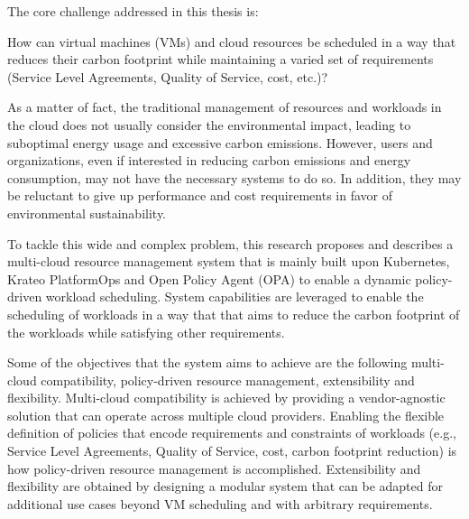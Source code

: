 
The core challenge addressed in this thesis is:
\begin{center}
    How can virtual machines (VMs) and cloud resources be scheduled in a way that reduces their carbon footprint while maintaining a varied set of requirements (Service Level Agreements, Quality of Service, cost, etc.)?
\end{center}

As a matter of fact, the traditional management of resources and workloads in the cloud does not usually consider the environmental impact, leading to suboptimal energy usage and excessive carbon emissions.
However, users and organizations, even if interested in reducing carbon emissions and energy consumption, may not have the necessary systems to do so.
In addition, they may be reluctant to give up performance and cost requirements in favor of environmental sustainability.

To tackle this wide and complex problem, this research proposes and describes a multi-cloud resource management system that is mainly built upon Kubernetes, Krateo PlatformOps and Open Policy Agent (OPA) to enable a dynamic policy-driven workload scheduling.
System capabilities are leveraged to enable the scheduling of workloads in a way that that aims to reduce the carbon footprint of the workloads while satisfying other requirements.

Some of the objectives that the system aims to achieve are the following multi-cloud compatibility, policy-driven resource management, extensibility and flexibility.
Multi-cloud compatibility is achieved by providing a vendor-agnostic solution that can operate across multiple cloud providers.
Enabling the flexible definition of policies that encode requirements and constraints of workloads (e.g., Service Level Agreements, Quality of Service, cost, carbon footprint reduction) is how policy-driven resource management is accomplished.
Extensibility and flexibility are obtained by designing a modular system that can be adapted for additional use cases beyond VM scheduling and with arbitrary requirements. \newline
    



